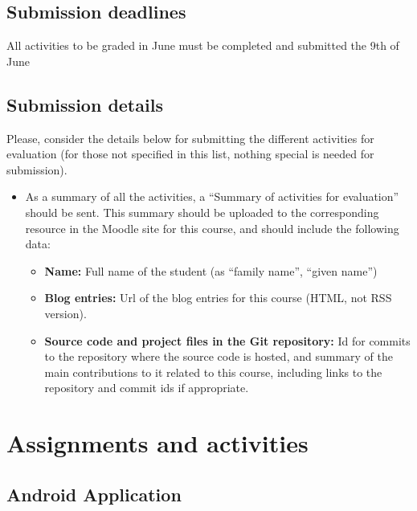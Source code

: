\documentclass[a4paper]{article}
\begin{document}
\subsection{Submission deadlines}

All activities to be graded in June must be completed and submitted 
the 9th of June

\subsection{Submission details}

Please, consider the details below for submitting the different
activities for evaluation (for those not specified in this list,
nothing special is needed for submission).


\begin{itemize}
\item As a summary of all the activities, a ``Summary of activities
  for evaluation'' should be sent. This summary should be uploaded to
  the corresponding resource in the Moodle site for this course, and
  should include the following data: 
  \begin{itemize}
  \item \textbf{Name:} Full name of the student (as ``family name'', ``given name'')
  \item \textbf{Blog entries:} Url of the blog entries for this course (HTML, not RSS version).
  \item \textbf{Source code and project files in the Git repository:} Id for commits
    to the repository where the source code is hosted, and summary of
    the main contributions to it related to this course, including
    links to the repository and commit ids if appropriate. 
  \end{itemize}
\end{itemize}

\section{Assignments and activities}


\subsection{Android Application }
\label{sub:gnome}
\end{document}
